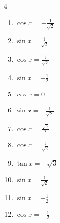 \begin{multicols}{4}
\begin{enumerate}
  \item $\displaystyle \cos{x}  = -\frac{1}{\sqrt{2}}$


  \item $\displaystyle \sin{x}  = \frac{1}{\sqrt{2}}$


  \item $\displaystyle \cos{x}  = \frac{1}{\sqrt{2}}$


  \item $\displaystyle \sin{x}  = -\frac{1}{2}$


  \item $\displaystyle \cos{x}  = 0$


  \item $\displaystyle \sin{x}  = -\frac{1}{\sqrt{2}}$


  \item $\displaystyle \cos{x}  = \frac{\sqrt{3}}{2}$


  \item $\displaystyle \cos{x}  = \frac{1}{\sqrt{2}}$


  \item $\displaystyle \tan{x}  = -\sqrt{3}$


  \item $\displaystyle \sin{x}  = \frac{1}{\sqrt{2}}$


  \item $\displaystyle \sin{x}  = -\frac{1}{2}$


  \item $\displaystyle \cos{x}  = -\frac{1}{2}$


\end{enumerate}
\end{multicols}
